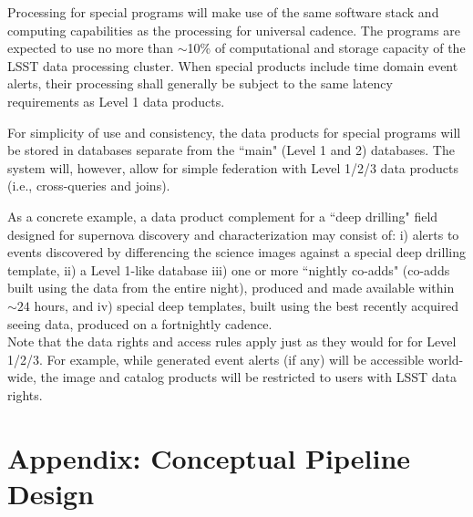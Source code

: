 \documentclass[12pt]{article}
\begin{document}
Processing for special programs will make use of the same software stack and computing capabilities as the processing for universal cadence. The programs are expected to use no more than $\sim$10\% of computational and storage capacity of the LSST data processing cluster. When special products include time domain event alerts, their processing shall generally be subject to the same latency requirements as Level 1 data products.

For simplicity of use and consistency, the data products for special programs will be stored in databases separate from the ``main" (Level 1 and 2) databases. The system will, however, allow for simple federation with Level 1/2/3 data products (i.e., cross-queries and joins).

As a concrete example, a data product complement for a ``deep drilling" field designed for supernova discovery and characterization may consist of: i) alerts to events discovered by differencing the science images against a special deep drilling template, ii) a Level 1-like database iii) one or more ``nightly co-adds" (co-adds built using the data from the entire night), produced and made available within $\sim 24$ hours, and iv) special deep templates, built using the best recently acquired seeing data, produced on a fortnightly cadence.
\\

Note that the data rights and access rules apply just as they would for for Level 1/2/3. For example, while generated event alerts (if any) will be accessible world-wide, the image and catalog products will be restricted to users with LSST data rights.




\clearpage
\section{\bf Appendix: Conceptual Pipeline Design \label{sec:scipi}}
\end{document}
